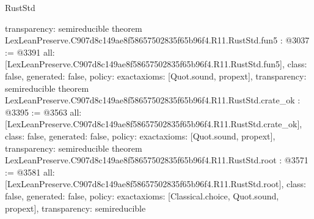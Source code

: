 \begin{lexlean}{RustStd}
\begin{coremodule}
{  transparency: semireducible
}
theorem LexLeanPreserve.C907d8c149ae8f58657502835f65b96f4.R11.RustStd.fun5 : @3037 := @3391 {
  all: [LexLeanPreserve.C907d8c149ae8f58657502835f65b96f4.R11.RustStd.fun5],
  class: false,
  generated: false,
  policy: exact{axioms: [Quot.sound, propext]},
  transparency: semireducible
}
theorem LexLeanPreserve.C907d8c149ae8f58657502835f65b96f4.R11.RustStd.crate_ok : @3395 := @3563 {
  all: [LexLeanPreserve.C907d8c149ae8f58657502835f65b96f4.R11.RustStd.crate_ok],
  class: false,
  generated: false,
  policy: exact{axioms: [Quot.sound, propext]},
  transparency: semireducible
}
theorem LexLeanPreserve.C907d8c149ae8f58657502835f65b96f4.R11.RustStd.root : @3571 := @3581 {
  all: [LexLeanPreserve.C907d8c149ae8f58657502835f65b96f4.R11.RustStd.root],
  class: false,
  generated: false,
  policy: exact{axioms: [Classical.choice, Quot.sound, propext]},
  transparency: semireducible
}


\end{coremodule}
\end{lexlean}
